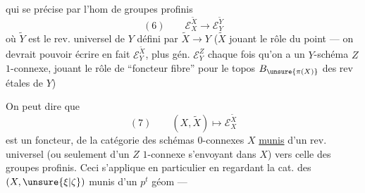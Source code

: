 
qui se précise par l'hom  de groupes profinis
\[
(6)\qquad \mathcal E_X^{\widetilde X}\longrightarrow\mathcal E_Y^{\widetilde Y}
\]
où $\widetilde Y$ est le rev. universel de $Y$ défini par $\widetilde X\longrightarrow Y$ ($\widetilde X$ jouant le rôle du point --- on devrait pouvoir écrire en fait $\mathcal E_Y^{\widetilde X}$, plus gén. $\mathcal E_Y^Z$ chaque fois qu'on a un $Y$-schéma $Z$ $1$-connexe, jouant le rôle de ``foncteur fibre'' pour le topos $B_{\unsure{\pi(X)}}$ des rev étales de $Y$)


On peut dire que
\[
(7)\qquad (X,\widetilde X)\longmapsto\mathcal E_X^{\widetilde X}
\]
est un foncteur, de la catégorie des schémas $0$-connexes $X$ \uline{munis} d'un rev. universel (ou seulement d'un $Z$ $1$-connexe s'envoyant dans $X$) vers celle des groupes profinis. Ceci s'applique en particulier en regardant la cat. des $(X,\unsure{\xi|\zeta})$ munis d'un $p^t$ géom ---

